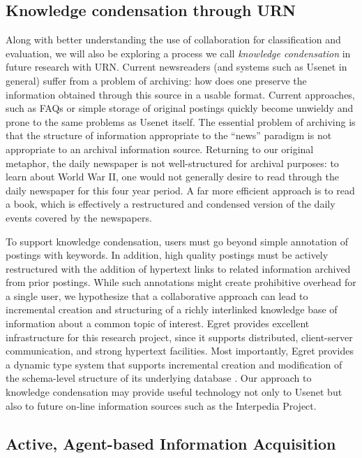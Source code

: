 \subsection{Knowledge condensation through URN}

Along with better understanding the use of collaboration for classification
and evaluation, we will also be exploring a process we call {\em knowledge
condensation} in future research with URN.  Current newsreaders (and
systems such as Usenet in general) suffer from a problem of archiving: how
does one preserve the information obtained through this source in a usable
format.  Current approaches, such as FAQs or simple storage of original
postings quickly become unwieldy and prone to the same problems as Usenet
itself.  The essential problem of archiving is that the structure of
information appropriate to the ``news'' paradigm is not appropriate to an
archival information source.  Returning to our original metaphor, the daily
newspaper is not well-structured for archival purposes: to learn about
World War II, one would not generally desire to read through the daily
newspaper for this four year period.  A far more efficient approach is to
read a book, which is effectively a restructured and condensed version of
the daily events covered by the newspapers.

To support knowledge condensation, users must go beyond simple annotation
of postings with keywords. In addition, high quality postings must be
actively restructured with the addition of hypertext links to related
information archived from prior postings.  While such annotations might
create prohibitive overhead for a single user, we hypothesize that a
collaborative approach can lead to incremental creation and structuring of
a richly interlinked knowledge base of information about a common topic of
interest.  Egret provides excellent infrastructure for this research
project, since it supports distributed, client-server communication, and
strong hypertext facilities. Most importantly, Egret provides a dynamic
type system that supports incremental creation and modification of the
schema-level structure of its underlying database \cite{csdl-93-09}.
Our approach to knowledge condensation may provide useful technology not
only to Usenet but also to future on-line information sources such as 
the Interpedia Project.

\subsection{Active, Agent-based Information Acquisition}

